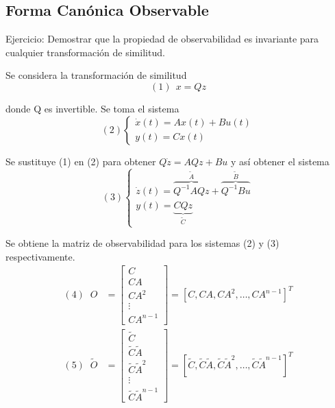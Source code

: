 \subsection{Forma Canónica Observable}
Ejercicio: Demostrar que la propiedad de observabilidad es invariante para cualquier transformación de similitud.

Se considera la transformación de similitud
\[(1)\:\:
    x = Qz
\]

donde Q es invertible. Se toma el sistema
\[(2)
    \left\{
        \begin{array}{lll}
            \dot{x}(t) = Ax(t) + Bu(t) \\
            y(t) = Cx(t)
        \end{array}
    \right.
\]

Se sustituye (1) en (2) para obtener \( Q\dot{z} = AQz+Bu \) y así obtener el sistema
\[(3)
    \left\{
        \begin{array}{lll}
            \dot{z}(t) =
                \overbrace{ Q^{-1}AQz }^{ \tilde{A} } + 
                \overbrace{ Q^{-1}Bu }^{ \tilde{B} } \\
            y(t) = 
            \underbrace{
                CQz
                        }_{\tilde{C}}
        \end{array}
    \right.
\]

Se obtiene la matriz de observabilidad para los sistemas (2) y (3) respectivamente.
\[
    \begin{split}
        (4) \;\;
        O & =\left[
        \begin{array}{cc}
            C \\
            CA \\
            CA^{2} \\
            \vdots \\
            CA^{n-1}
        \end{array}\right]
        = [C, CA, CA^{2}, \ldots, CA^{n-1}]^{T}
        \\
        (5) \;\;
        \tilde{O} & = \left[
        \begin{array}{cc}
            \tilde{C} \\
            \tilde{C}\tilde{A} \\
            \tilde{C}\tilde{A}^{2} \\
            \vdots \\
            \tilde{C}\tilde{A}^{n-1}
        \end{array}\right]
        = [\tilde{C}, \tilde{C}\tilde{A}, \tilde{C}\tilde{A}^{2}, \ldots, \tilde{C}\tilde{A}^{n-1}]^{T}
    \end{split}
\]

